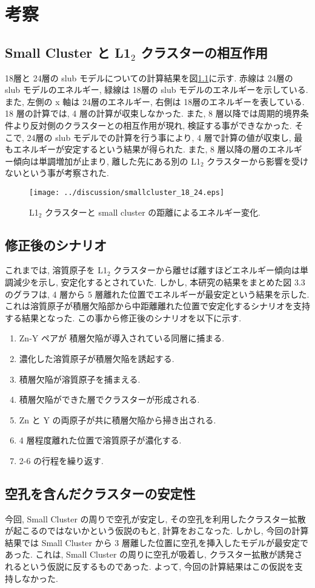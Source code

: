 \chapter{考察}

\section{ Small Cluster と L1$_2$ クラスターの相互作用}
18層と 24層の slub モデルについての計算結果を図\ref{fig4.1}に示す. 赤線は 24層の slub モデルのエネルギー, 緑線は 18層の slub モデルのエネルギーを示している. また, 左側の x 軸は 24層のエネルギー, 右側は 18層のエネルギーを表している. 18 層の計算では, 4 層の計算が収束しなかった. また, 8 層以降では周期的境界条件より反対側のクラスターとの相互作用が現れ, 検証する事ができなかった. そこで, 24層の slub モデルでの計算を行う事により, 4 層で計算の値が収束し, 最もエネルギーが安定するという結果が得られた. また, 8 層以降の層のエネルギー傾向は単調増加が止まり, 離した先にある別の L1$_2$ クラスターから影響を受けないという事が考察された.


\begin{figure}[htbp]
\begin{center}
\texttt{[image: ../discussion/smallcluster\_18\_24.eps]}
\caption{L1$_2$ クラスターと small cluster の距離によるエネルギー変化.}
\label{fig4.1}
\end{center}
\end{figure}

\section{修正後のシナリオ}
これまでは, 溶質原子を L1$_2$ クラスターから離せば離すほどエネルギー傾向は単調減少を示し, 安定化するとされていた\cite{sakamoto}. しかし, 本研究の結果をまとめた図 3.3 のグラフは, 4 層から 5 層離れた位置でエネルギーが最安定という結果を示した. これは溶質原子が積層欠陥部から中距離離れた位置で安定化するシナリオを支持する結果となった.
この事から修正後のシナリオを以下に示す.

\begin{enumerate}
 \item Zn-Y ペアが 積層欠陥が導入されている同層に捕まる.
 \item 濃化した溶質原子が積層欠陥を誘起する.
 \item 積層欠陥が溶質原子を捕まえる.
 \item 積層欠陥ができた層でクラスターが形成される.
 \item Zn と Y の両原子が共に積層欠陥から掃き出される.
 \item 4 層程度離れた位置で溶質原子が濃化する.
 \item 2-6 の行程を繰り返す.
\end{enumerate}


\section{空孔を含んだクラスターの安定性}
今回, Small Cluster の周りで空孔が安定し, その空孔を利用したクラスター拡散が起こるのではないかという仮説のもと, 計算をおこなった. しかし, 今回の計算結果では Small Cluster から 3 層離した位置に空孔を挿入したモデルが最安定であった. これは, Small Cluster の周りに空孔が吸着し, クラスター拡散が誘発されるという仮説に反するものであった. よって, 今回の計算結果はこの仮説を支持しなかった.




